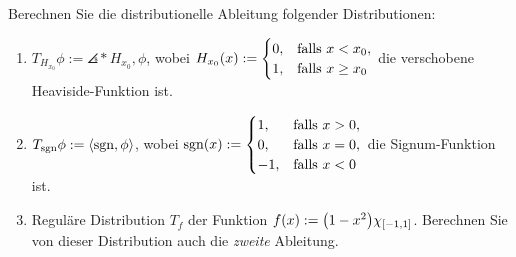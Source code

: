 \documentclass{exercise}
\begin{document}
    \begin{problem}
        Berechnen Sie die distributionelle Ableitung folgender Distributionen:
        \begin{enumerate}
            \item \(T_{H_{x_0}}\phi := \angles*{H_{x_0}, \phi}\), wobei \(H_{x_0}\parentheses*{x} := \begin{cases}
                0, & \text{falls }x < x_0,\\
                1, & \text{falls }x \ge x_0
            \end{cases}\) die verschobene Heaviside-Funktion ist.
            \item \(T_{\sgn} \phi := \angles*{\sgn, \phi}\), wobei \(\sgn\parentheses*{x} := \begin{cases}
                1, & \text{falls }x > 0,\\
                0, & \text{falls }x = 0,\\
                -1, & \text{falls }x < 0
            \end{cases}\)
            die Signum-Funktion ist.
            \item Reguläre Distribution \(T_f\) der Funktion \(f\parentheses*{x} := \parentheses*{1 - x^2}\chi_{\brackets*{-1, 1}}\).
            Berechnen Sie von dieser Distribution auch die \emph{zweite} Ableitung.
        \end{enumerate}
    \end{problem}
\end{document}
